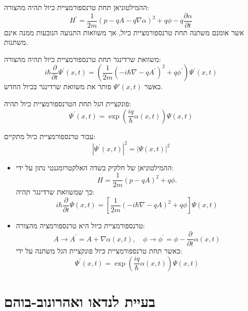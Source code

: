 \documentclass{tstextbook}
\begin{document}
\begin{proposition}
ההמילטוניאן תחת טרנספורמציית כיול תהיה מהצורה:
$$H^{\prime}=\frac{1}{2m}\left(p-q A-q\nabla\alpha\right)^{2}+q\phi-q\frac{\partial\alpha}{\partial t}$$
אשר אומנם משתנה תחת טרנספורמציית כיול, אך משוואות התנועה הנובעות ממנה אינם משתנות.

\end{proposition}
\begin{corollary}
משוואת שרדינגר תחת טרנספורמציית כיול תהיה מהצורה:
$$i\hbar{\frac{\partial}{\partial t}}\Psi^{\prime}(x,t)=\left({\frac{1}{2m}}\left(-i\hbar\nabla-q A^{\prime}\right)^{2}+q\phi^{\prime}\right)\Psi^{\prime}(x,t)$$
כאשר \(\Psi'(x,t)\) פותר את משוואת שרדינגר בכיול החדש.

\end{corollary}
\begin{corollary}
פונקציית הגל תחת הטרנספורמציית כיול תהיה:
$$\Psi^{\prime}(x,t)=\exp\left(\frac{i q}{\hbar}\alpha(x,t)\right)\Psi(x,t)$$

\end{corollary}
\begin{corollary}
עבור טרנספורמציית כיול מתקיים:
$$|\Psi^{\prime}(x,t)|^{2}=|\Psi(x,t)|^{2}$$

\end{corollary}
\begin{summary}
  \begin{itemize}
    \item ההמילטוניאן של חלקיק בשדה האלקטרומגנטי נתון על ידי:
$$H={\frac{1}{2m}}(p-q A)^{2}+q\phi.$$
כך שמשוואת שרדינגר תהיה:
$$i\hbar{\frac{\partial}{\partial t}}\Psi(x,t)=\left[{\frac{1}{2m}}\left(-i\hbar\nabla-q A\right)^{2}+q\phi\right]\Psi(x,t)$$
    \item טרנספורמציית כיול היא טרנספורמציה מהצורה:
$$A\to A^{\prime}=A+\nabla\alpha(x,t),\quad\phi\to\phi^{\prime}=\phi-\frac{\partial}{\partial t}\alpha(x,t)$$
כאשר תחת טרנספורמציית כיול פונקציית הגל משתנה על ידי:
$$\Psi^{\prime}(x,t)=\exp\left({\frac{i q}{\hbar}}\alpha(x,t)\right)\Psi(x,t)$$
  \end{itemize}
\end{summary}
\section{בעיית לנדאו ואהרונוב-בוהם}
\end{document}
